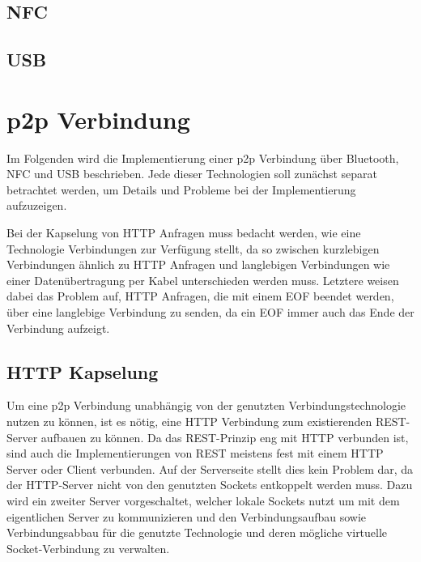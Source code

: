 \documentclass[12pt,a4paper]{article}
\begin{document}
		\subsection{NFC}
		
		\subsection{USB}
		
        \section{p2p Verbindung}
        Im Folgenden wird die Implementierung einer p2p Verbindung über Bluetooth, NFC und USB beschrieben. Jede dieser Technologien soll zunächst separat betrachtet werden, um Details und Probleme bei der Implementierung aufzuzeigen.
        
        Bei der Kapselung von HTTP Anfragen muss bedacht werden, wie eine Technologie Verbindungen zur Verfügung stellt, da so zwischen kurzlebigen Verbindungen ähnlich zu HTTP Anfragen und langlebigen Verbindungen wie einer Datenübertragung per Kabel unterschieden werden muss. Letztere weisen dabei das Problem auf, HTTP Anfragen, die mit einem EOF beendet werden, über eine langlebige Verbindung zu senden, da ein EOF immer auch das Ende der Verbindung aufzeigt.
        
        \subsection{HTTP Kapselung}
        Um eine p2p Verbindung unabhängig von der genutzten Verbindungstechnologie nutzen zu können, ist es nötig, eine HTTP Verbindung zum existierenden REST-Server aufbauen zu können. Da das REST-Prinzip eng mit HTTP verbunden ist, sind auch die Implementierungen von REST meistens fest mit einem HTTP Server oder Client verbunden. Auf der Serverseite stellt dies kein Problem dar, da der HTTP-Server nicht von den genutzten Sockets entkoppelt werden muss. Dazu wird ein zweiter Server vorgeschaltet, welcher lokale Sockets nutzt um mit dem eigentlichen Server zu kommunizieren und den Verbindungsaufbau sowie Verbindungsabbau für die genutzte Technologie und deren mögliche virtuelle Socket-Verbindung zu verwalten.
        
\end{document}
